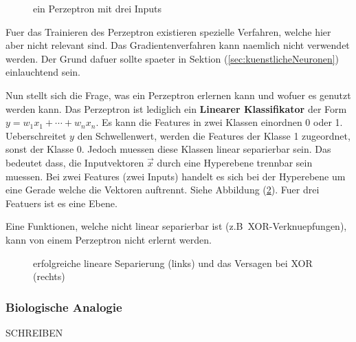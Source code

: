 \documentclass[../main]{subfiles}
\begin{document}
\begin{figure}[h!]
  \centering
  \caption{ein Perzeptron mit drei Inputs}
  \label{fi:perzeptron}
\end{figure}

Fuer das Trainieren des Perzeptron existieren spezielle Verfahren, welche hier
aber nicht relevant sind. Das Gradientenverfahren kann naemlich nicht verwendet
werden. Der Grund dafuer sollte spaeter in Sektion (\ref{sec:kuenstlicheNeuronen}) einlauchtend sein.
\par\medskip
Nun stellt sich die Frage, was ein Perzeptron erlernen kann und wofuer es genutzt werden kann.
Das Perzeptron ist lediglich ein \textbf{Linearer Klassifikator} der Form
$y=w_1x_1+\cdots+w
_nx_n$.
Es kann die Features in zwei Klassen einordnen 0 oder 1.
Ueberschreitet $y$ den Schwellenwert, werden die Features der Klasse 1 zugeordnet, sonst
der Klasse 0.
Jedoch muessen diese Klassen linear separierbar sein.
Das bedeutet dass, die Inputvektoren $\vec{x}$ durch eine Hyperebene trennbar
sein muessen.
Bei zwei Features (zwei Inputs) handelt es sich bei der Hyperebene um eine
Gerade welche die Vektoren auftrennt. Siehe Abbildung (\ref{fig:linearer_Klassifikator}).
Fuer drei Featuers ist es eine Ebene.

Eine Funktionen, welche nicht linear separierbar ist (z.B\ XOR-Verknuepfungen),
kann von einem Perzeptron nicht erlernt werden.

\begin{figure}[h!]

  \caption{erfolgreiche lineare Separierung (links) und das Versagen bei XOR (rechts)}
  \label{fig:linearer_Klassifikator}
\end{figure}

\cite{wiki:perzeptron}

\subsubsection{Biologische Analogie}
SCHREIBEN
\end{document}
